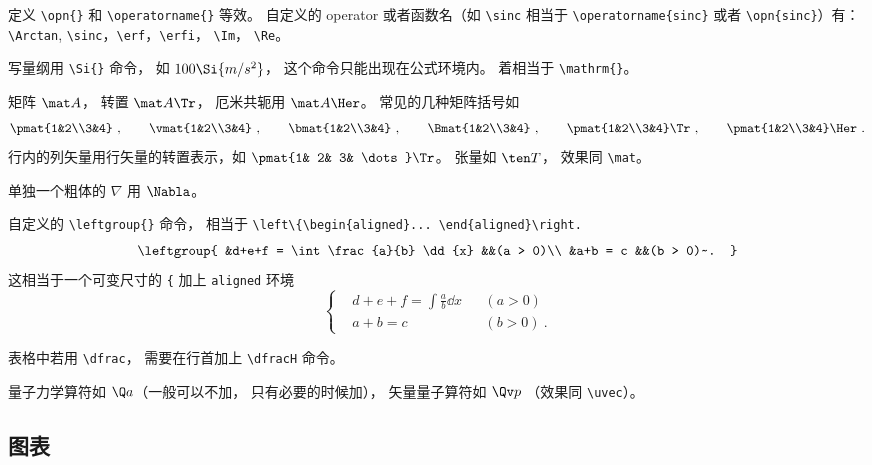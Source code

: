 定义 \verb|\opn{}| 和 \verb|\operatorname{}| 等效。 自定义的 operator 或者函数名（如 \verb|\sinc| 相当于 \verb|\operatorname{sinc}| 或者 \verb|\opn{sinc}|）有： \verb|\Arctan|, \verb|\sinc|，\verb|\erf|，\verb|\erfi|， \verb|\Im|， \verb|\Re|。

写量纲用 \verb|\Si{}| 命令， 如 $100\Si{m/s^2}$， 这个命令只能出现在公式环境内。 着相当于 \verb|\mathrm{}|。

矩阵 $\mat A$， 转置 $\mat A\Tr$， 厄米共轭用 $\mat A\Her$。 常见的几种矩阵括号如
\begin{equation}
\pmat{1&2\\3&4}~, \qquad
\vmat{1&2\\3&4}~, \qquad 
\bmat{1&2\\3&4}~, \qquad
\Bmat{1&2\\3&4}~, \qquad
\pmat{1&2\\3&4}\Tr~, \qquad
\pmat{1&2\\3&4}\Her~.
\end{equation}
行内的列矢量用行矢量的转置表示，如 $\pmat{1& 2& 3& \dots}\Tr$。 张量如 $\ten T$， 效果同 \verb|\mat|。

单独一个粗体的 $\nabla$ 用 $\Nabla$。

自定义的 \verb|\leftgroup{}| 命令， 相当于 \verb|\left\{\begin{aligned}... \end{aligned}\right.|
\begin{equation}
\leftgroup{
&d+e+f = \int \frac{a}{b} \dd{x} &&(a > 0)\\
&a+b = c &&(b > 0)~.
}
\end{equation}
这相当于一个可变尺寸的 \verb|{| 加上 \verb|aligned| 环境
\begin{equation}
\left\{
\begin{aligned}
&d+e+f = \int \frac{a}{b} \dd{x} &&(a > 0)\\
&a+b = c &&(b > 0)~.
\end{aligned}
\right.
\end{equation}

表格中若用 \verb|\dfrac|， 需要在行首加上 \verb|\dfracH| 命令。%

量子力学算符如 $\Q a$（一般可以不加， 只有必要的时候加）， 矢量量子算符如 $\Qv p$ （效果同 \verb|\uvec|）。

\subsection{图表}

